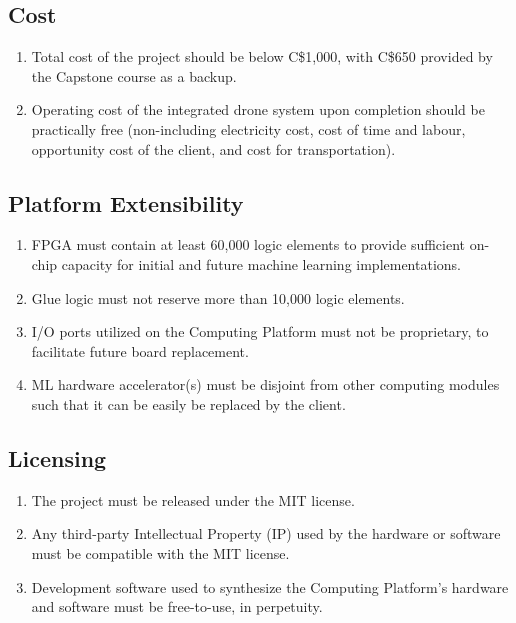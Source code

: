 \documentclass[10pt,letterpaper]{article}
\begin{document}
\subsection{Cost}
\begin{enumerate}[label=C.CT.\arabic*, wide=1cm, widest=3cm, leftmargin=*, font=\bfseries, noitemsep,topsep=0pt, parsep=4pt, partopsep=0pt]
    \item Total cost of the project should be below C\$1,000, with C\$650 provided by the Capstone course as a backup.
    \item Operating cost of the integrated drone system upon completion should be practically free (non-including electricity cost, cost of time and labour, opportunity cost of the client, and cost for transportation).
\end{enumerate}

\subsection{Platform Extensibility}
\begin{enumerate}[label=C.EX.\arabic*, wide=1cm, widest=3cm, leftmargin=*, font=\bfseries, noitemsep,topsep=0pt, parsep=4pt, partopsep=0pt]
    \item FPGA must contain at least 60,000 logic elements to provide sufficient on-chip capacity for initial and future machine learning implementations.
    \item Glue logic must not reserve more than 10,000 logic elements.
    \item I/O ports utilized on the Computing Platform must not be proprietary, to facilitate future board replacement.
    \item ML hardware accelerator(s) must be disjoint from other computing modules such that it can be easily be replaced by the client.
\end{enumerate}

\subsection{Licensing}
\begin{enumerate}[label=C.EX.\arabic*, wide=1cm, widest=3cm, leftmargin=*, font=\bfseries, noitemsep,topsep=0pt, parsep=4pt, partopsep=0pt]
    \item The project must be released under the MIT license.
    \item Any third-party Intellectual Property (IP) used by the hardware or software must be compatible with the MIT license.
    \item Development software used to synthesize the Computing Platform's hardware and software must be free-to-use, in perpetuity.
\end{enumerate}
\end{document}
